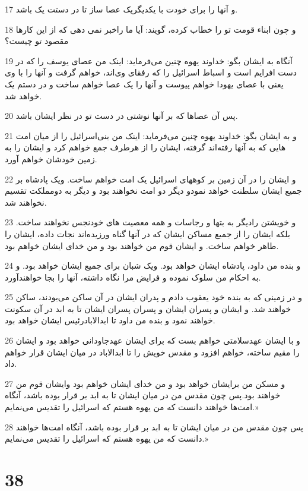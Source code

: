 \par 17 و آنها را برای خودت با یکدیگریک عصا ساز تا در دستت یک باشد.
\par 18 و چون ابناء قومت تو را خطاب کرده، گویند: آیا ما راخبر نمی دهی که از این کارها مقصود تو چیست؟
\par 19 آنگاه به ایشان بگو: خداوند یهوه چنین می‌فرماید: اینک من عصای یوسف را که در دست افرایم است و اسباط اسرائیل را که رفقای وی‌اند، خواهم گرفت و آنها را با وی یعنی با عصای یهودا خواهم پیوست و آنها را یک عصا خواهم ساخت و در دستم یک خواهد شد.
\par 20 پس آن عصاها که بر آنها نوشتی در دست تو در نظر ایشان باشد.
\par 21 و به ایشان بگو: خداوند یهوه چنین می‌فرماید: اینک من بنی‌اسرائیل را از میان امت هایی که به آنها رفته‌اند گرفته، ایشان را از هرطرف جمع خواهم کرد و ایشان را به زمین خودشان خواهم آورد.
\par 22 و ایشان را در آن زمین بر کوههای اسرائیل یک امت خواهم ساخت. ویک پادشاه بر جمیع ایشان سلطنت خواهد نمودو دیگر دو امت نخواهند بود و دیگر به دومملکت تقسیم نخواهند شد.
\par 23 و خویشتن رادیگر به بتها و رجاسات و همه معصیت های خودنجس نخواهند ساخت. بلکه ایشان را از جمیع مساکن ایشان که در آنها گناه ورزیده‌اند نجات داده، ایشان را طاهر خواهم ساخت. و ایشان قوم من خواهند بود و من خدای ایشان خواهم بود.
\par 24 و بنده من داود، پادشاه ایشان خواهد بود. ویک شبان برای جمیع ایشان خواهد بود. و به احکام من سلوک نموده و فرایض مرا نگاه داشته، آنها را بجا خواهند‌آورد.
\par 25 و در زمینی که به بنده خود یعقوب دادم و پدران ایشان در آن ساکن می‌بودند، ساکن خواهند شد. و ایشان و پسران ایشان و پسران پسران ایشان تا به ابد در آن سکونت خواهند نمود و بنده من داود تا ابدالابادرئیس ایشان خواهد بود.
\par 26 و با ایشان عهدسلامتی خواهم بست که برای ایشان عهدجاودانی خواهد بود و ایشان را مقیم ساخته، خواهم افزود و مقدس خویش را تا ابدالاباد در میان ایشان قرار خواهم داد.
\par 27 و مسکن من برایشان خواهد بود و من خدای ایشان خواهم بود وایشان قوم من خواهند بود.پس چون مقدس من در میان ایشان تا به ابد بر قرار بوده باشد، آنگاه امت‌ها خواهند دانست که من یهوه هستم که اسرائیل را تقدیس می‌نمایم.»
\par 28 پس چون مقدس من در میان ایشان تا به ابد بر قرار بوده باشد، آنگاه امت‌ها خواهند دانست که من یهوه هستم که اسرائیل را تقدیس می‌نمایم.»

\chapter{38}

